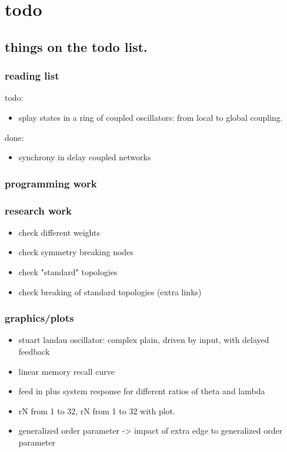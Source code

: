\chapter{todo}

\section{things on the todo list.}

\subsection{reading list}
	todo:
	\begin{itemize}
		\item \cite{ZOU09b} splay states in a ring of coupled oscillators: from local to global coupling.
	\end{itemize}
	
	done:
	\begin{itemize}
		\item \cite{EAR03, CHO09, YEU99} synchrony in delay coupled networks
	\end{itemize}
	

\subsection{programming work}

\subsection{research work}
\begin{itemize}
    \item check different weights
    \item check symmetry breaking nodes
    \item check "standard" topologies
    \item check breaking of standard topologies (extra links)
\end{itemize}

\subsection{graphics/plots}
\begin{itemize}
	\item stuart landau oscillator: complex plain, driven by input, with delayed feedback
	\item linear memory recall curve
    \item feed in plus system response for different ratios of theta and lambda
    \item rN from 1 to 32, rN from 1 to 32 with plot.
    \item generalized order parameter -> impact of extra edge to generalized order parameter
    
\end{itemize}

